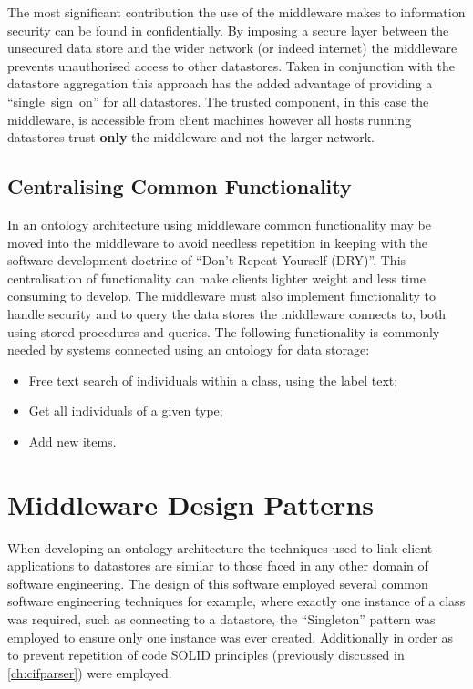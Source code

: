 The most significant contribution the use of the middleware makes to information security can be found in confidentially. By imposing a secure layer between the unsecured data store and the wider network (or indeed internet) the middleware prevents unauthorised access to other datastores. Taken in conjunction with the datastore aggregation this approach has the added advantage of providing a ``single~sign~on'' for all datastores. The trusted component, in this case the middleware, is accessible from client machines however all hosts running datastores trust \textbf{only} the middleware and not the larger network. 

\subsection{Centralising Common Functionality}\label{midfunc}
In an ontology architecture using middleware common functionality may be moved into the middleware to avoid needless repetition in keeping with the software development doctrine of \enquote{Don't Repeat Yourself (DRY)}. This centralisation of functionality can make clients lighter weight and less time consuming to develop. The middleware must also implement functionality to handle security and to query the data stores the middleware connects to, both using stored procedures and queries. The following functionality is commonly needed by systems connected using an ontology for data storage:
\begin{itemize}
    \item Free text search of individuals within a class, using the label text;
    \item Get all individuals of a given type;
    \item Add new items.    
\end{itemize}


\section{Middleware Design Patterns}
When developing an ontology architecture the techniques used to link client applications to datastores are similar to those faced in any other domain of software engineering. 
The design of this software employed several common software engineering techniques for example, where exactly one instance of a class was required, such as connecting to a datastore, the \enquote{Singleton} pattern was employed to ensure only one instance was ever created. Additionally in order as to prevent repetition of code SOLID principles (previously discussed in \autoref{ch:cifparser}) were employed.


